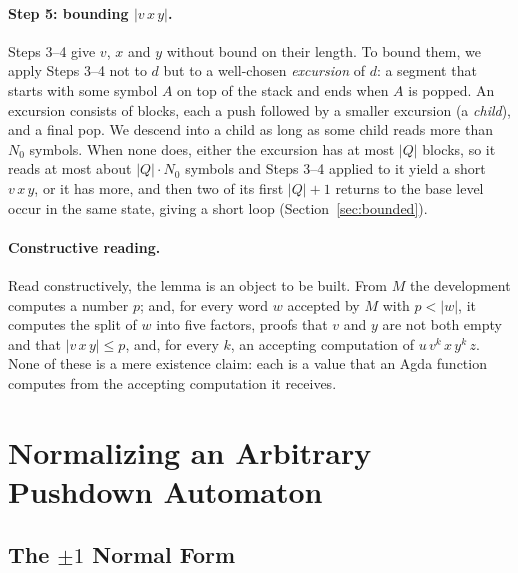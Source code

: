 \documentclass[runningheads]{llncs}
\begin{document}
\paragraph{Step 5: bounding $|v\,x\,y|$.} Steps 3--4 give $v$, $x$ and $y$
without bound on their length. To bound them, we apply Steps 3--4 not to $d$ but
to a well-chosen \emph{excursion} of $d$: a segment that starts with some symbol
$A$ on top of the stack and ends when $A$ is popped. An excursion consists of
blocks, each a push followed by a smaller excursion (a \emph{child}), and a
final pop. We descend into a child as long as some child reads more than $N_0$
symbols. When none does, either the excursion has at most $|Q|$ blocks, so it
reads at most about $|Q|\cdot N_0$ symbols and Steps 3--4 applied to it yield a
short $v\,x\,y$, or it has more, and then two of its first $|Q|+1$ returns to the
base level occur in the same state, giving a short loop
(Section~\ref{sec:bounded}).

\paragraph{Constructive reading.} Read constructively, the lemma is an object
to be built. From $M$ the development computes a number $p$; and, for every word
$w$ accepted by $M$ with $p < |w|$, it computes the split of $w$ into five
factors, proofs that $v$ and $y$ are not both empty and that $|v\,x\,y| \leq p$,
and, for every $k$, an accepting computation of $u\,v^{k}\,x\,y^{k}\,z$. None of
these is a mere existence claim: each is a value that an Agda function computes
from the accepting computation it receives.

\section{Normalizing an Arbitrary Pushdown Automaton}\label{sec:normalization}

\subsection{The $\pm 1$ Normal Form}\label{sec:normal}
\end{document}
